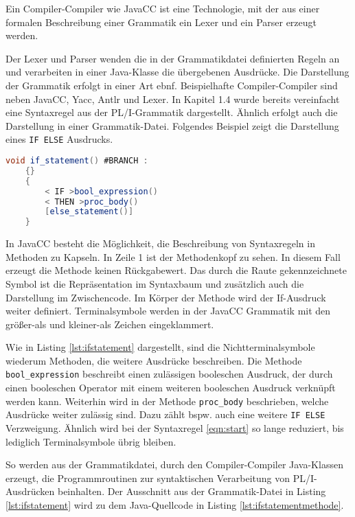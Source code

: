 Ein Compiler-Compiler wie JavaCC ist eine Technologie, mit der aus einer formalen Beschreibung einer Grammatik ein Lexer und ein Parser erzeugt werden. 

Der Lexer und Parser wenden die in der Grammatikdatei definierten Regeln an und verarbeiten in einer Java-Klasse die übergebenen Ausdrücke.
Die Darstellung der Grammatik erfolgt in einer Art \ac{ebnf}.  Beispielhafte Compiler-Compiler sind neben JavaCC, Yacc, Antlr und Lexer. In Kapitel 1.4 wurde bereits vereinfacht eine Syntaxregel aus der PL/I-Grammatik dargestellt. Ähnlich erfolgt auch die Darstellung in einer Grammatik-Datei. Folgendes Beispiel zeigt die Darstellung eines \verb+IF ELSE+ Ausdrucks. 


\begin{lstlisting}[language=Java, caption=JavaCC Syntaxregel einer Verzweigung, label={lst:ifstatement}]
	void if_statement() #BRANCH :
	{}
	{
		< IF >bool_expression()
		< THEN >proc_body()
		[else_statement()]
	}
\end{lstlisting}

In JavaCC besteht die Möglichkeit, die Beschreibung von Syntaxregeln in Methoden zu Kapseln.
In Zeile 1 ist der Methodenkopf zu sehen. In diesem Fall erzeugt die Methode keinen Rückgabewert.
Das durch die Raute gekennzeichnete Symbol ist die Repräsentation im Syntaxbaum und zusätzlich auch die Darstellung im Zwischencode.
Im Körper der Methode wird der If-Ausdruck weiter definiert. Terminalsymbole werden in der JavaCC Grammatik mit den größer-als und kleiner-als Zeichen eingeklammert. 

Wie in Listing \ref{lst:ifstatement} dargestellt, sind die Nichtterminalsymbole wiederum Methoden, die  weitere Ausdrücke beschreiben. Die Methode \verb+bool_expression+ beschreibt einen zulässigen booleschen Ausdruck, der durch einen booleschen Operator mit einem weiteren booleschen Ausdruck verknüpft werden kann. Weiterhin wird in der Methode \verb+proc_body+ beschrieben, welche Ausdrücke weiter zulässig sind. Dazu zählt bspw. auch eine weitere \verb+IF ELSE+ Verzweigung. Ähnlich wird bei der Syntaxregel \ref{eqn:start} so lange reduziert, bis lediglich Terminalsymbole übrig bleiben.

So werden aus der Grammatikdatei, durch den Compiler-Compiler Java-Klassen erzeugt, die Programmroutinen zur syntaktischen Verarbeitung von PL/I-Ausdrücken beinhalten.
Der Ausschnitt aus der Grammatik-Datei in Listing \ref{lst:ifstatement} wird zu dem Java-Quellcode in Listing \ref{lst:ifstatementmethode}.
\pagebreak

